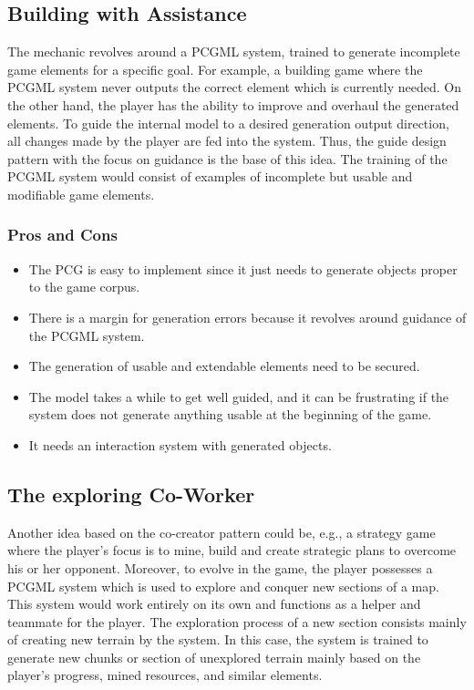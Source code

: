 \documentclass[MGS,Master,english]{twbook}%
\begin{document}
\subsection{Building with Assistance} \label{idea::buildingWithAssistance}
The mechanic revolves around a \ac{PCGML} system, trained to generate incomplete game elements for a specific goal. For example, a building game where the \ac{PCGML} system never outputs the correct element which is currently needed. On the other hand, the player has the ability to improve and overhaul the generated elements. To guide the internal model to a desired generation output direction, all changes made by the player are fed into the system. Thus, the guide design pattern with the focus on guidance is the base of this idea. The training of the \ac{PCGML} system would consist of examples of incomplete but usable and modifiable game elements.

\subsubsection{Pros and Cons}
\begin{itemize}
	\item The \ac{PCG} is easy to implement since it just needs to generate objects proper to the game corpus.
	\item There is a margin for generation errors because it revolves around guidance of the \ac{PCGML} system.
	\item The generation of usable and extendable elements need to be secured.
	\item The model takes a while to get well guided, and it can be frustrating if the system does not generate anything usable at the beginning of the game.
	\item It needs an interaction system with generated objects.
\end{itemize}


\subsection{The exploring Co-Worker} \label{idea::exploringCoWorker}
Another idea based on the co-creator pattern could be, e.g., a strategy game where the player’s focus is to mine, build and create strategic plans to overcome his or her opponent. Moreover, to evolve in the game, the player possesses a \ac{PCGML} system which is used to explore and conquer new sections of a map. This system would work entirely on its own and functions as a helper and teammate for the player. The exploration process of a new section consists mainly of creating new terrain by the system. In this case, the system is trained to generate new chunks or section of unexplored terrain mainly based on the player’s progress, mined resources, and similar elements.
\end{document}
